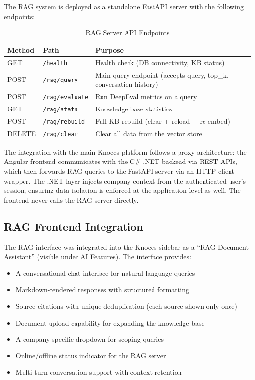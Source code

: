 The RAG system is deployed as a standalone FastAPI server with the following endpoints:

\begin{table}[H]
\centering
\caption{RAG Server API Endpoints}
\label{tab:rag_endpoints}
\begin{tabular}{|l|l|p{7.5cm}|}
\hline
\textbf{Method} & \textbf{Path} & \textbf{Purpose} \\ \hline
GET & \texttt{/health} & Health check (DB connectivity, KB status) \\ \hline
POST & \texttt{/rag/query} & Main query endpoint (accepts query, top\_k, conversation history) \\ \hline
POST & \texttt{/rag/evaluate} & Run DeepEval metrics on a query \\ \hline
GET & \texttt{/rag/stats} & Knowledge base statistics \\ \hline
POST & \texttt{/rag/rebuild} & Full KB rebuild (clear + reload + re-embed) \\ \hline
DELETE & \texttt{/rag/clear} & Clear all data from the vector store \\ \hline
\end{tabular}
\end{table}

The integration with the main Knoccs platform follows a proxy architecture: the Angular frontend communicates with the C\# .NET backend via REST APIs, which then forwards RAG queries to the FastAPI server via an HTTP client wrapper. The .NET layer injects company context from the authenticated user's session, ensuring data isolation is enforced at the application level as well. The frontend never calls the RAG server directly.

\subsection{RAG Frontend Integration}

The RAG interface was integrated into the Knoccs sidebar as a ``RAG Document Assistant'' (visible under AI Features). The interface provides:

\begin{itemize}
    \item A conversational chat interface for natural-language queries
    \item Markdown-rendered responses with structured formatting
    \item Source citations with unique deduplication (each source shown only once)
    \item Document upload capability for expanding the knowledge base
    \item A company-specific dropdown for scoping queries
    \item Online/offline status indicator for the RAG server
    \item Multi-turn conversation support with context retention
\end{itemize}

